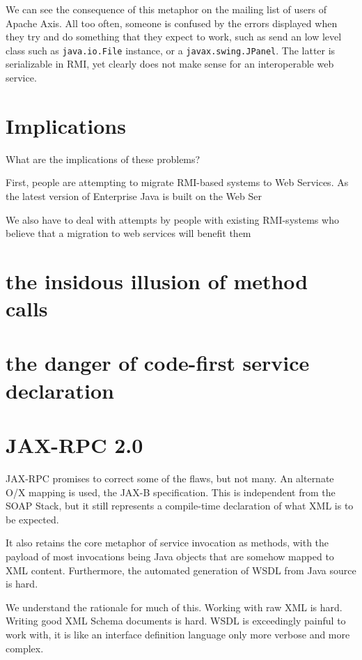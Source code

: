 \documentclass[draft]{paper}
\begin{document}
We can see the consequence of this metaphor on the mailing list of users of
Apache Axis. All too often, someone is confused by the errors displayed when
they try and do something that they expect to work, such as send an low level
class such as \verb|java.io.File| instance, or a \verb|javax.swing.JPanel|. The
latter is serializable in RMI, yet clearly does not make sense for an
interoperable web service. 


\section{Implications}

What are the implications of these problems?

First, people are attempting to migrate RMI-based systems to Web Services. As
the latest version of Enterprise Java is built on the Web Ser

We also have to deal with attempts by people with
existing RMI-systems who believe that a migration to web services will benefit
them 


  



\section{the insidous illusion of method calls}

\section{the danger of code-first service declaration}



\section{JAX-RPC 2.0}

JAX-RPC promises to correct some of the flaws, but not many. 
An alternate O/X mapping is used, the JAX-B specification. This is independent
from the SOAP Stack, but it still represents a compile-time declaration of what
XML is to be expected. 


It also retains the core metaphor of service invocation as methods, with the 
payload of most invocations being Java objects that are somehow mapped to XML content.
Furthermore, the automated generation of WSDL from Java source is hard. 

We understand the rationale for much of this. Working with raw XML is hard. 
Writing good XML Schema documents is hard. WSDL is exceedingly painful to work with,
it is like an interface definition language only more verbose and more complex. 
\end{document}
